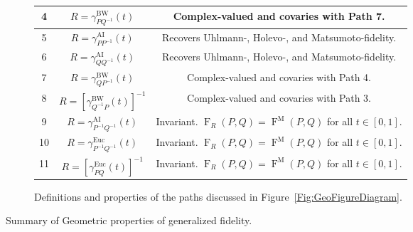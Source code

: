 \documentclass[12pt]{article}
\theoremstyle{definition}
\begin{document}
\begin{figure}[htbp]
\begin{subfigure}[b]{1\textwidth}
\begin{tabular}{|c|c|c|}
            4 & $R = \gamma^\text{BW}_{P Q ^{-1} }(t)  $  & Complex-valued and covaries with Path 7. \\ \hline

            5 & $R = \gamma^\text{AI}_{P P ^{-1} }(t)  $  & Recovers Uhlmann-, Holevo-, and Matsumoto-fidelity. \\ \hline 

            6 & $R = \gamma^\text{AI}_{Q Q^{-1} }(t)  $  & Recovers Uhlmann-, Holevo-, and Matsumoto-fidelity. \\ \hline 

            7 & $R = \gamma^\text{BW}_{Q P ^{-1} }(t)  $  & Complex-valued and covaries with Path 4. \\ \hline

            8 & $R = \left[\gamma^\text{BW}_{Q ^{-1} P }(t)\right]^{-1}   $  & Complex-valued and covaries with Path 3. \\ \hline

            9 & $R = \gamma^\text{AI}_{ P ^{-1} Q ^{-1} }(t)  $  & Invariant. $\operatorname{F}_R(P,Q) = \operatorname{F}^\mathrm M(P,Q) $ for all $t \in [0,1].$ \\ \hline

            10 & $R = \gamma^\text{Euc}_{ P ^{-1} Q ^{-1} }(t)  $  & Invariant. $\operatorname{F}_R(P,Q) = \operatorname{F}^\mathrm M(P,Q) $ for all $t \in [0,1].$ \\ \hline
            
            11 & $R = \left[\gamma^\text{Euc}_{ P Q }(t)\right]^{-1}  $  & Invariant. $\operatorname{F}_R(P,Q) = \operatorname{F}^\mathrm M(P,Q) $ for all $t \in [0,1].$ \\ \hline
        \end{tabular}
        \caption{Definitions and properties of the paths discussed in Figure~\ref{Fig:GeoFigureDiagram}.}
        \label{Fig:GeoFigureTable}
    \end{subfigure}
    \caption{Summary of Geometric properties of generalized fidelity.}
    \label{Fig:Geodesic}
\end{figure}
\end{document}
